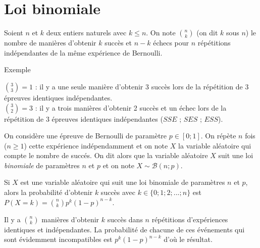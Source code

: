 \documentclass[french]{book}
\begin{document}
\section{Loi binomiale}



\begin{defn}
Soient $n$ et $k$ deux entiers naturels avec $k\leq n$. On note $\binom{n}{k}$ (on dit \og{}$k$ sous $n$\fg{}) le nombre de manières d'obtenir $k$ succès et $n-k$ échecs pour $n$ répétitions indépendantes de la même expérience de Bernoulli. 
\end{defn}


\begin{exemple}{Exemple}

\noindent $\binom{3}{3}=1$ : il y a une seule manière d'obtenir 3 succès lors de la répétition de 3 épreuves identiques indépendantes.\\
$\binom{3}{2}=3$ : il y a trois manières d'obtenir 2 succès et un échec lors de la répétition de 3 épreuves identiques indépendantes ($SSE$ ; $SES$ ; $ESS$).
\end{exemple}

\begin{defn}
On considère une épreuve de Bernoulli de paramètre $p\in [0;1]$. On répète $n$ fois ($n\geq 1$) cette expérience indépendamment et on note $X$ la variable aléatoire qui compte le nombre de succés. On dit alors que la variable aléatoire $X$ suit une loi \emph{binomiale} de paramètres $n$ et $p$ et on note $X\sim \mathcal{B}(n;p)$.
\end{defn}


\begin{prop}
 Si $X$ est une variable aléatoire qui suit une loi binomiale de paramètres $n$ et $p$, alors la probabilité d'obtenir $k$ succès avec $k\in\{0;1;2;...;n\}$ est $P(X=k)=\binom{n}{k}p^k(1-p)^{n-k}$.
\end{prop}

\begin{demo}
Il y a $\binom{n}{k}$ manières d'obtenir $k$ succès dans $n$ répétitions d'expériences identiques et indépendantes. La probabilité de chacune de ces événements qui sont évidemment incompatibles est $p^k(1-p)^{n-k}$ d'où le résultat.
\end{demo} 
\end{document}
